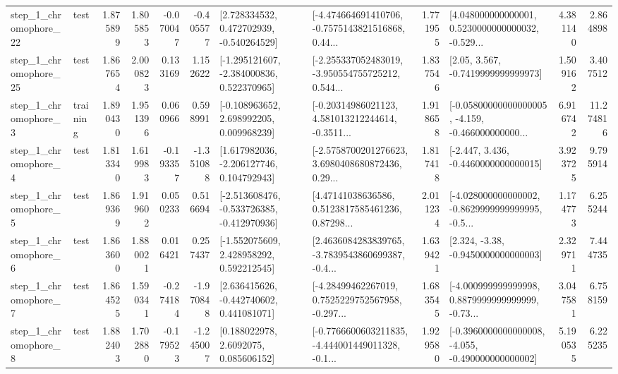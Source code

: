 \begin{tabular}{llrrrrllrlrr}
    step\_1\_chromophore\_22 &      test &      1.875899 &    1.805853 &     -0.070047 & -0.405577 &    [2.728334532, 0.472702939, -0.540264529] &  [-4.474664691410706, -0.7575143821516868, 0.44... &       1.771955 &  [4.048000000000001, 0.5230000000000032, -0.529... &            4.381140 &          2.864898 \\
    step\_1\_chromophore\_25 &      test &      1.867654 &    2.000823 &      0.133169 &  1.152622 &   [-1.295121607, -2.384000836, 0.522370965] &  [-2.255337052483019, -3.950554755725212, 0.544... &       1.837546 &                 [2.05, 3.567, -0.7419999999999973] &            1.509162 &          3.407512 \\
     step\_1\_chromophore\_3 &  training &      1.890430 &    1.951396 &      0.060966 &  0.598991 &    [-0.108963652, 2.698992205, 0.009968239] &  [-0.20314986021123, 4.581013212244614, -0.3511... &       1.918658 &  [-0.05800000000000005, -4.159, -0.466000000000... &            6.916742 &         11.274816 \\
     step\_1\_chromophore\_4 &      test &      1.813340 &    1.619983 &     -0.193357 & -1.351088 &    [1.617982036, -2.206127746, 0.104792943] &  [-2.5758700201276623, 3.6980408680872436, 0.29... &       1.817418 &               [-2.447, 3.436, -0.4460000000000015] &            3.923725 &          9.795914 \\
     step\_1\_chromophore\_5 &      test &      1.869369 &    1.919602 &      0.050233 &  0.516694 &  [-2.513608476, -0.533726385, -0.412970936] &  [4.47141038636586, 0.5123817585461236, 0.87298... &       2.011234 &  [-4.028000000000002, -0.8629999999999995, -0.5... &            1.174773 &          6.255244 \\
     step\_1\_chromophore\_6 &      test &      1.863600 &    1.880021 &      0.016421 &  0.257437 &    [-1.552075609, 2.428958292, 0.592212545] &  [2.4636084283839765, -3.7839543860699387, -0.4... &       1.639421 &                [2.324, -3.38, -0.9450000000000003] &            2.329711 &          7.444735 \\
     step\_1\_chromophore\_7 &      test &      1.864525 &    1.590341 &     -0.274184 & -1.970848 &    [2.636415626, -0.442740602, 0.441081071] &  [-4.28499462267019, 0.7525229752567958, -0.297... &       1.683545 &  [-4.000999999999998, 0.8879999999999999, -0.73... &            3.047581 &          6.758159 \\
     step\_1\_chromophore\_8 &      test &      1.882403 &    1.702880 &     -0.179523 & -1.245007 &       [0.188022978, 2.6092075, 0.085606152] &  [-0.7766600603211835, -4.444001449011328, -0.1... &       1.929580 &  [-0.3960000000000008, -4.055, -0.490000000000002] &            5.190535 &          6.225235 \\

\end{tabular}
